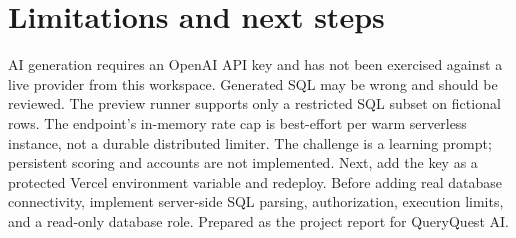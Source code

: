 \documentclass[11pt]{article}
\begin{document}
\section{Limitations and next steps}
AI generation requires an OpenAI API key and has not been exercised against a live provider from this workspace. Generated SQL may be wrong and should be reviewed. The preview runner supports only a restricted SQL subset on fictional rows. The endpoint's in-memory rate cap is best-effort per warm serverless instance, not a durable distributed limiter. The challenge is a learning prompt; persistent scoring and accounts are not implemented.
Next, add the key as a protected Vercel environment variable and redeploy. Before adding real database connectivity, implement server-side SQL parsing, authorization, execution limits, and a read-only database role.
\vfill\noindent\textcolor{muted}{Prepared as the project report for QueryQuest AI.}
\end{document}

